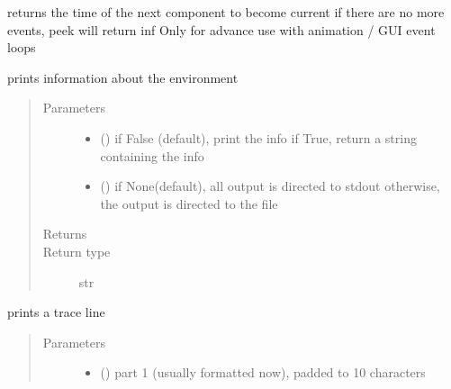 \documentclass[letterpaper,10pt,english]{sphinxmanual}
\begin{document}
\begin{fulllineitems}

\begin{fulllineitems}
\label{\detokenize{Reference:salabim.Environment.peek}}
returns the time of the next component to become current 
if there are no more events, peek will return inf 
Only for advance use with animation / GUI event loops

\end{fulllineitems}


\begin{fulllineitems}
\label{\detokenize{Reference:salabim.Environment.print_info}}
prints information about the environment
\begin{quote}\begin{description}
\item[{Parameters}] \leavevmode\begin{itemize}
\item {} 
 () \textendash{} if False (default), print the info
if True, return a string containing the info

\item {} 
 () \textendash{} if None(default), all output is directed to stdout 
otherwise, the output is directed to the file

\end{itemize}

\item[{Returns}] \leavevmode
{}

\item[{Return type}] \leavevmode
str

\end{description}\end{quote}

\end{fulllineitems}


\begin{fulllineitems}
\label{\detokenize{Reference:salabim.Environment.print_trace}}
prints a trace line
\begin{quote}\begin{description}
\item[{Parameters}] \leavevmode\begin{itemize}
\item {} 
 () \textendash{} part 1 (usually formatted  now), padded to 10 characters


\end{itemize}
\end{description}
\end{quote}
\end{fulllineitems}
\end{fulllineitems}
\end{document}
